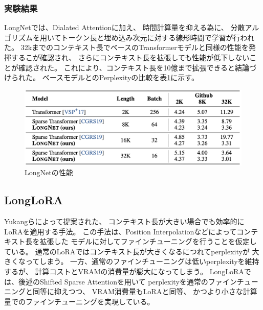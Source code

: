 \documentclass{jsarticle}
\begin{document}
        \subsubsection{実験結果}
            LongNetでは、Dialated Attentionに加え、
            時間計算量を抑える為に、
            分散アルゴリズムを用いてトークン長と埋め込み次元に対する線形時間で学習が行われた。
            32kまでのコンテキスト長でベースのTransformerモデルと同様の性能を発揮するこが確認され、
            さらにコンテキスト長を拡張しても性能が低下しないことが確認された。
            これにより、コンテキスト長を10億まで拡張できると結論づけられた。
            ベースモデルとのPerplexityの比較を表\ref{tab:longnet}に示す。
            \begin{figure}[ht]
                \caption{LongNetの性能\cite{longnet}}
                \label{tab:longnet}
                \centering
                \includegraphics[width=\hsize]{longnet.png}
            \end{figure}

    \subsection{LongLoRA}
        Yukangら\cite{longlora}によって提案された、
        コンテキスト長が大きい場合でも効率的にLoRAを適用する手法。
        この手法は、Position Interpolationなどによってコンテキスト長を拡張した
        モデルに対してファインチューニングを行うことを仮定している。
        通常のLoRAではコンテキスト長が大きくなるにつれてperplexityが
        大きくなってしまう。
        一方、通常のファインチューニングは低いperplexityを維持するが、
        計算コストとVRAMの消費量が膨大になってしまう。
        LongLoRAでは、後述のShifted Sparse Attentionを用いて
        perplexityを通常のファインチューニングと同等に抑えつつ、
        VRAM消費量もLoRAと同等、
        かつより小さな計算量でのファインチューニングを実現している。
\end{document}
